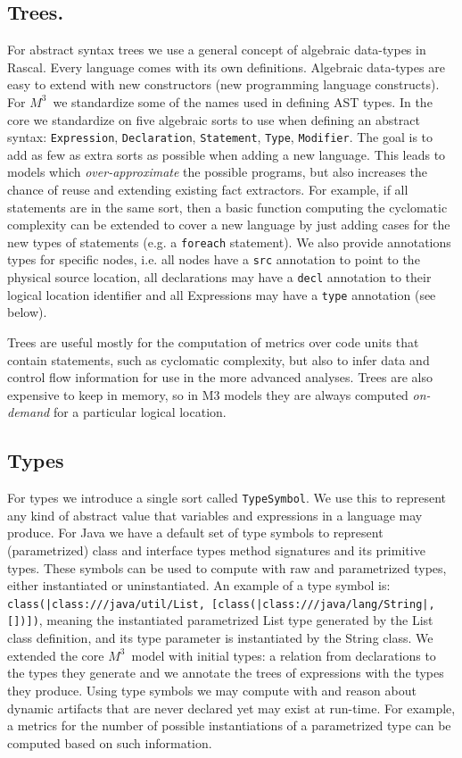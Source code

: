 \documentclass[a4]{IEEEtran}
\newcommand{\loc}[1]{\small{\texttt{#1}}}
\newcommand{\mthree}{\ensuremath{M^3}}
\begin{document}
\subsection{Trees.} For abstract syntax trees we use a general concept of algebraic data-types in Rascal. Every language comes with its own definitions. Algebraic data-types are easy to extend with new constructors (new programming language constructs). For \mthree\ we standardize some of the names used in defining AST types. In the core we standardize on five algebraic sorts to use when defining an abstract syntax: \texttt{Expression}, \texttt{Declaration}, \texttt{Statement}, \texttt{Type}, \texttt{Modifier}. The goal is to add as few as extra sorts as possible when adding a new language. This leads to models which \emph{over-approximate} the possible programs, but also increases the chance of reuse and extending existing fact extractors. For example, if all statements are in the same sort, then a basic function computing the cyclomatic complexity can be extended to cover a new language by just adding cases for the new types of statements (e.g. a \texttt{foreach} statement). We also provide annotations types for specific nodes, i.e. all nodes have a \texttt{src} annotation to point to the physical source location, all declarations may have a \texttt{decl} annotation to their logical location identifier and all Expressions may have a \texttt{type} annotation (see below).

Trees are useful mostly for the computation of metrics over code units that contain statements, such as cyclomatic complexity, but also to infer data and control flow information for use in the more advanced analyses. Trees are also expensive to keep in memory, so in M3 models they are always computed \emph{on-demand} for a particular logical location.

\subsection{Types} For types we introduce a single sort called \texttt{TypeSymbol}. We use this to represent any kind of abstract value that variables and expressions in a language may produce. For Java we have a default set of type symbols to represent (parametrized) class and interface types method signatures and its primitive types. These symbols can be used to compute with raw and parametrized types, either instantiated or uninstantiated. An example of a type symbol is: \loc{class(|class:///java/util/List, [class(|class:///java/lang/String|,[])])}, meaning the instantiated parametrized List type generated by the List class definition, and its type parameter is instantiated by the String class. We extended the core \mthree\  model with initial types: a relation from declarations to the types they generate and we annotate the trees of expressions with the types they produce. Using type symbols we may compute with and reason about dynamic artifacts that are never declared yet may exist at run-time. For example, a metrics for the number of possible instantiations of a parametrized type can be computed based on such information.
\end{document}
